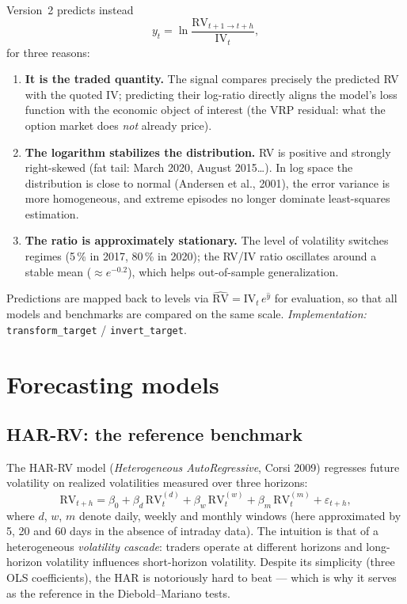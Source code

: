 \documentclass[11pt,a4paper]{article}
\newcommand{\RV}{\mathrm{RV}}
\newcommand{\IV}{\mathrm{IV}}
\begin{document}
Version~2 predicts instead
\begin{equation}
y_t = \ln\frac{\RV_{t+1\to t+h}}{\IV_t},
\label{eq:target}
\end{equation}
for three reasons:
\begin{enumerate}
\item \textbf{It is the traded quantity.} The signal compares precisely the
  predicted RV with the quoted IV; predicting their log-ratio directly aligns
  the model's loss function with the economic object of interest (the VRP
  residual: what the option market does \emph{not} already price).
\item \textbf{The logarithm stabilizes the distribution.} RV is positive and
  strongly right-skewed (fat tail: March 2020, August 2015\ldots). In log
  space the distribution is close to normal (Andersen et al., 2001), the
  error variance is more homogeneous, and extreme episodes no longer dominate
  least-squares estimation.
\item \textbf{The ratio is approximately stationary.} The level of volatility
  switches regimes (5\,\% in 2017, 80\,\% in 2020); the RV/IV ratio
  oscillates around a stable mean ($\approx e^{-0.2}$), which helps
  out-of-sample generalization.
\end{enumerate}
Predictions are mapped back to levels via
$\widehat{\RV} = \IV_t\, e^{\hat{y}}$ for evaluation, so that all models and
benchmarks are compared on the same scale.
\emph{Implementation:} \texttt{transform\_target} / \texttt{invert\_target}.

\section{Forecasting models}

\subsection{HAR-RV: the reference benchmark}

The HAR-RV model (\emph{Heterogeneous AutoRegressive}, Corsi 2009) regresses
future volatility on realized volatilities measured over three horizons:
\begin{equation}
\RV_{t+h} = \beta_0 + \beta_d\, \RV_t^{(d)} + \beta_w\, \RV_t^{(w)}
+ \beta_m\, \RV_t^{(m)} + \varepsilon_{t+h},
\end{equation}
where $d$, $w$, $m$ denote daily, weekly and monthly windows (here
approximated by 5, 20 and 60 days in the absence of intraday data). The
intuition is that of a heterogeneous \emph{volatility cascade}: traders
operate at different horizons and long-horizon volatility influences
short-horizon volatility. Despite its simplicity (three OLS coefficients),
the HAR is notoriously hard to beat --- which is why it serves as the
reference in the Diebold--Mariano tests.
\end{document}
